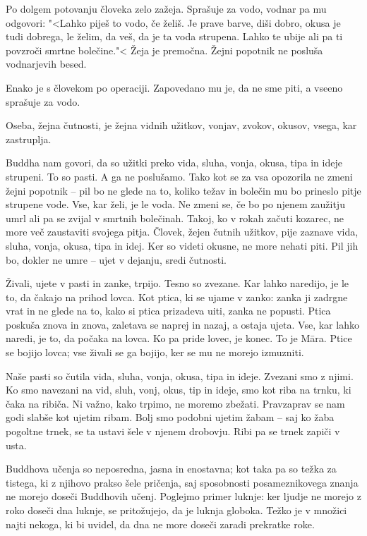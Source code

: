 
Po dolgem potovanju človeka zelo zažeja. Sprašuje za vodo, vodnar pa mu odgovori: "<Lahko piješ to vodo, če želiš. Je prave barve, diši dobro, okusa je tudi dobrega, le želim, da veš, da je ta voda strupena. Lahko te ubije ali pa ti povzroči smrtne bolečine."< Žeja je premočna. Žejni popotnik ne posluša vodnarjevih besed.

Enako je s človekom po operaciji. Zapovedano mu je, da ne sme piti, a vseeno sprašuje za vodo.

Oseba, žejna čutnosti, je žejna vidnih užitkov, vonjav, zvokov, okusov, vsega, kar zastruplja.

Buddha nam govori, da so užitki preko vida, sluha, vonja, okusa, tipa in ideje strupeni. To so pasti. A ga ne poslušamo. Tako kot se za vsa opozorila ne zmeni žejni popotnik – pil bo ne glede na to, koliko težav in bolečin mu bo prineslo pitje strupene vode. Vse, kar želi, je le voda. Ne zmeni se, če bo po njenem zaužitju umrl ali pa se zvijal v smrtnih bolečinah. Takoj, ko v rokah začuti kozarec, ne more več zaustaviti svojega pitja. Človek, žejen čutnih užitkov, pije zaznave vida, sluha, vonja, okusa, tipa in idej. Ker so videti okusne, ne more nehati piti. Pil jih bo, dokler ne umre – ujet v dejanju, sredi čutnosti.

\clearpage


Živali, ujete v pasti in zanke, trpijo. Tesno so zvezane. Kar lahko naredijo, je le to, da čakajo na prihod lovca. Kot ptica, ki se ujame v zanko: zanka ji zadrgne vrat in ne glede na to, kako si ptica prizadeva uiti, zanka ne popusti. Ptica poskuša znova in znova, zaletava se naprej in nazaj, a ostaja ujeta. Vse, kar lahko naredi, je to, da počaka na lovca. Ko pa pride lovec, je konec. To je Māra. Ptice se bojijo lovca; vse živali se ga bojijo, ker se mu ne morejo izmuzniti.

Naše pasti so čutila vida, sluha, vonja, okusa, tipa in ideje. Zvezani smo z njimi. Ko smo navezani na vid, sluh, vonj, okus, tip in ideje, smo kot riba na trnku, ki čaka na ribiča. Ni važno, kako trpimo, ne moremo zbežati. Pravzaprav se nam godi slabše kot ujetim ribam. Bolj smo podobni ujetim žabam – saj ko žaba pogoltne trnek, se ta ustavi šele v njenem drobovju. Ribi pa se trnek zapiči v usta.

\clearpage


Buddhova učenja so neposredna, jasna in enostavna; kot taka pa so težka za tistega, ki z njihovo prakso šele pričenja, saj sposobnosti posameznikovega znanja ne morejo doseči Buddhovih učenj. Poglejmo primer luknje: ker ljudje ne morejo z roko doseči dna luknje, se pritožujejo, da je luknja globoka. Težko je v množici najti nekoga, ki bi uvidel, da dna ne more doseči zaradi prekratke roke.

